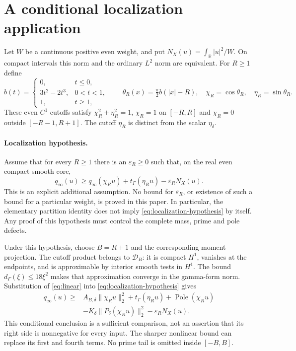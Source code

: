 \documentclass[11pt]{article}
\newcommand{\R}{\mathbb R}
\newcommand{\norm}[1]{\lVert#1\rVert}
\newcommand{\Pole}{\operatorname{Pole}}
\begin{document}
\section{A conditional localization application}\label{sec:localization}
Let $W$ be a continuous positive even weight, and put
$N_X(u)=\int_\R |u|^2/W$. On compact intervals this norm and the ordinary
$L^2$ norm are equivalent. For $R\ge1$ define
\[
 b(t)=\begin{cases}0,&t\le0,\\3t^2-2t^3,&0<t<1,\\1,&t\ge1,\end{cases}
 \qquad \theta_R(x)=\tfrac\pi2b(|x|-R),
 \quad\chi_R=\cos\theta_R,\quad\eta_R=\sin\theta_R.
\]
These even $C^1$ cutoffs satisfy $\chi_R^2+\eta_R^2=1$,
$\chi_R=1$ on $[-R,R]$ and $\chi_R=0$ outside $[-R-1,R+1]$.
The cutoff $\eta_R$ is distinct from the scalar $\eta_\delta$.

\paragraph{Localization hypothesis.}
Assume that for every $R\ge1$ there is an $\varepsilon_R\ge0$ such that,
on the real even compact smooth core,
\begin{equation}
 q_\infty(u)\ge q_\infty(\chi_Ru)+t_\Gamma(\eta_Ru)
                   -\varepsilon_RN_X(u).
 \label{eq:localization-hypothesis}
\end{equation}
This is an explicit additional assumption. No bound for
$\varepsilon_R$, or existence of such a bound for a particular weight,
is proved in this paper. In particular, the elementary partition identity
does not imply \eqref{eq:localization-hypothesis} by itself. Any proof of
this hypothesis must control the complete mass, prime and pole defects.

Under this hypothesis, choose $B=R+1$ and the corresponding moment
projection. The cutoff product belongs to $\mathcal D_B$: it is compact
$H^1$, vanishes at the endpoints, and is approximable by interior smooth
tests in $H^1$. The bound $d_\Gamma(\xi)\le18\xi^2$ makes that
approximation converge in the gamma-form norm. Substitution of
\eqref{eq:linear} into \eqref{eq:localization-hypothesis} gives
\begin{equation}
 \boxed{\begin{aligned}
 q_\infty(u)\ge{}&A_{B,\delta}\norm{\chi_Ru}_2^2+t_\Gamma(\eta_Ru)
                  +\Pole(\chi_Ru)\\
                &-K_\delta\norm{P_\delta(\chi_Ru)}_2^2
                  -\varepsilon_RN_X(u).
 \end{aligned}}
 \label{eq:global}
\end{equation}
This conditional conclusion is a sufficient comparison, not an assertion
that its right side is nonnegative for every input. The sharper nonlinear
bound can replace its first and fourth terms. No prime tail is omitted
inside $[-B,B]$.
\end{document}
